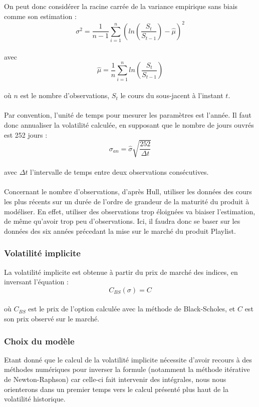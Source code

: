\documentclass[french,12pt,a4paper]{article}
\begin{document}
On peut donc considérer la racine carrée de la variance empirique sans biais comme son estimation :\\
$$ \widehat{\sigma^{2}} = \frac{1}{n-1} \sum_{i=1}^n (ln(\frac{S_{t}}{S_{t-1}}) - \widehat{\mu})^{2}    $$ \\
avec \\
$$ \widehat{\mu} = \frac{1}{n} \sum_{i=1}^n ln(\frac{S_{t}}{S_{t-1}})  $$ \\
où $n$ est le nombre d'observations, $S_{t}$ le cours du sous-jacent à l'instant $t$. \\ \\
Par convention, l'unité de temps pour mesurer les paramètres est l'année. Il faut donc annualiser la volatilité calculée, en supposant que le nombre de jours ouvrés est 252 jours : \\
$$ \sigma_{an} = \widehat{\sigma} \sqrt{\frac{252}{\Delta t}}  $$ \\
avec $\Delta t $ l'intervalle de temps entre deux observations consécutives.\\ \\
Concernant le nombre d'observations, d'après Hull, utiliser les données des cours les plus récents sur un durée de l'ordre de grandeur de la maturité du produit à modéliser. En effet, utiliser des observations trop éloignées va biaiser l'estimation, de même qu'avoir trop peu d'observations. Ici, il faudra donc se baser sur les données des six années précedant la mise sur le marché du produit Playlist.\\

\subsubsection{Volatilité implicite}
La volatilité implicite est obtenue à partir du prix de marché des indices, en inversant l'équation :
$$ C_{BS}(\sigma) = C $$ \\
où $C_{BS}$ est le prix de l'option calculée avec la méthode de Black-Scholes, et $C$ est son prix observé sur le marché.\\

\subsubsection{Choix du modèle}
Etant donné que le calcul de la volatilité implicite nécessite d'avoir recours à des méthodes numériques pour inverser la formule (notamment la méthode itérative de Newton-Raphson) car celle-ci fait intervenir des intégrales, nous nous orienterons dans un premier temps vers le calcul présenté plus haut de la volatilité historique.
\end{document}
